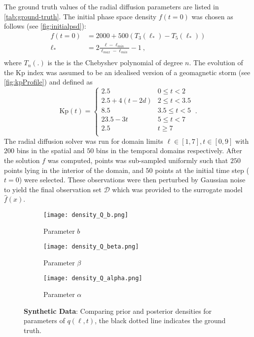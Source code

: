  
The ground truth values of the radial diffusion parameters are listed in \cref{tab:ground-truth}.
%
The initial phase space density $f(t = 0)$ was chosen as follows (see \cref{fig:initialpsd}):
%
\begin{align*}
f(t = 0) &= 2000 + 500(T_{3}(\ell_*) - T_{5}(\ell_*)) \\
\ell_* &= 2\frac{\ell - \ell_{min}}{\ell_{max} - \ell_{min}} - 1 \ ,\\
\end{align*}
%
where $T_n(.)$ is the is the Chebyshev polynomial of degree $n$. The evolution of the Kp index was 
assumed to be an idealised version of a geomagnetic storm (see \cref{fig:kpProfile}) and 
defined as 
\[
  \mathrm{Kp}(t) = \left\{\begin{matrix}
    2.5 & 0 \leq t < 2\\ 
    2.5 + 4(t - 2d) & 2 \leq t < 3.5\\ 
    8.5 & 3.5 \leq  t < 5 \\ 
    23.5 - 3t & 5 \leq t < 7\\
    2.5 & t \geq 7\\ 
    \end{matrix}\right. \ .
\] 
%
The radial diffusion solver was run for domain limits $\ell \in [1, 7], t \in [0, 9]$ with $200$ 
bins in the spatial and $50$ bins in the temporal domains respectively. After the solution $f$ was 
computed, points was sub-sampled uniformly such that $250$ points lying in the interior of the 
domain, and $50$ points at the initial time step ($t = 0$) were selected. These observations were 
then perturbed by Gaussian noise to yield the final observation set $\mathcal{D}$ which was 
provided to the surrogate model $\hat{f}(x)$.

\begin{figure*}[!htb]
  \centering
  \begin{subfigure}[b]{0.5\textwidth}
    \centering
    \texttt{[image: density\_Q\_b.png]}
    \caption{ Parameter $b$}
    \label{fig:qb}
  \end{subfigure}
  \hfill
  \begin{subfigure}[b]{0.5\textwidth}
    \centering
    \texttt{[image: density\_Q\_beta.png]}
    \caption{Parameter $\beta$}
    \label{fig:qbeta}
  \end{subfigure}
  \hfill
  \begin{subfigure}[b]{0.5\textwidth}
    \centering
    \texttt{[image: density\_Q\_alpha.png]}
    \caption{Parameter $\alpha$}
    \label{fig:qalpha}
  \end{subfigure}
  \caption{\textbf{Synthetic Data}: Comparing prior and posterior densities for 
  parameters of $q(\ell, t)$, the black dotted line indicates the ground truth.}  
\end{figure*}

